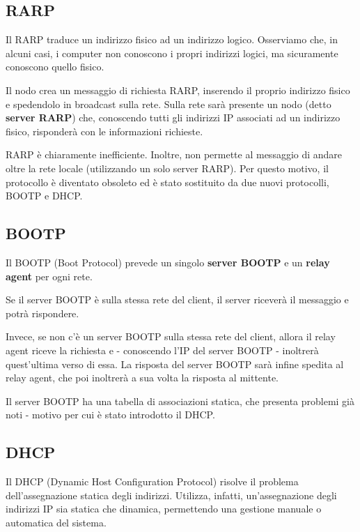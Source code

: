     \subsection{RARP}
    
        Il RARP traduce un indirizzo fisico ad un indirizzo logico. Osserviamo che, in alcuni casi, i computer non conoscono i propri indirizzi logici, ma sicuramente conoscono quello fisico.
        
        Il nodo crea un messaggio di richiesta RARP, inserendo il proprio indirizzo fisico e spedendolo in broadcast sulla rete. Sulla rete sarà presente un nodo (detto \textbf{server RARP}) che, conoscendo tutti gli indirizzi IP associati ad un indirizzo fisico, risponderà con le informazioni richieste.
        
        \vspace{3mm}
        
        RARP è chiaramente inefficiente. Inoltre, non permette al messaggio di andare oltre la rete locale (utilizzando un solo server RARP). Per questo motivo, il protocollo è diventato obsoleto ed è stato sostituito da due nuovi protocolli, BOOTP e DHCP.
        
    \subsection{BOOTP}
    
        Il BOOTP (Boot Protocol) prevede un singolo \textbf{server BOOTP} e un \textbf{relay agent} per ogni rete.
        
        Se il server BOOTP è sulla stessa rete del client, il server riceverà il messaggio e potrà rispondere.
        
        Invece, se non c'è un server BOOTP sulla stessa rete del client, allora il relay agent riceve la richiesta e - conoscendo l'IP del server BOOTP - inoltrerà quest'ultima verso di essa. La risposta del server BOOTP sarà infine spedita al relay agent, che poi inoltrerà a sua volta la risposta al mittente.
        
        Il server BOOTP ha una tabella di associazioni statica, che presenta problemi già noti - motivo per cui è stato introdotto il DHCP.
        
    \subsection{DHCP}
    
        Il DHCP (Dynamic Host Configuration Protocol) risolve il problema dell'assegnazione statica degli indirizzi. Utilizza, infatti, un'assegnazione degli indirizzi IP sia statica che dinamica, permettendo una gestione manuale o automatica del sistema.
        
